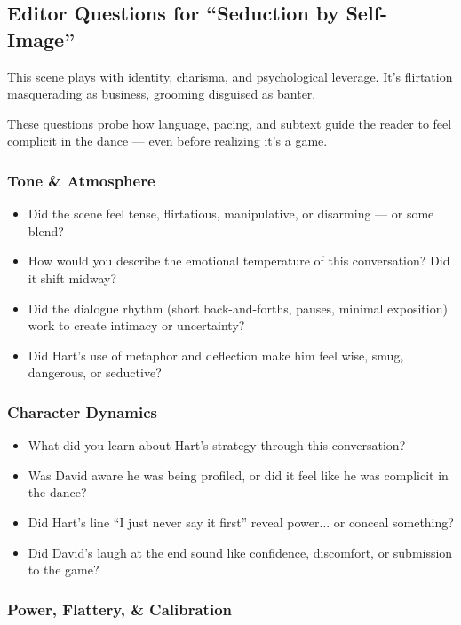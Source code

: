 \subsection*{Editor Questions for ``Seduction by Self-Image''}
This scene plays with identity, charisma, and psychological leverage.
It's flirtation masquerading as business, grooming disguised as banter.

These questions probe how language, pacing, and subtext guide the reader to feel complicit in the dance — even before realizing it’s a game.

\subsubsection{Tone \& Atmosphere}

\begin{itemize}
    \item Did the scene feel tense, flirtatious, manipulative, or disarming — or some blend?
    \item How would you describe the emotional temperature of this conversation? Did it shift midway?
    \item Did the dialogue rhythm (short back-and-forths, pauses, minimal exposition) work to create intimacy or uncertainty?
    \item Did Hart’s use of metaphor and deflection make him feel wise, smug, dangerous, or seductive?
\end{itemize}

\subsubsection{Character Dynamics}

\begin{itemize}
    \item What did you learn about Hart’s strategy through this conversation?
    \item Was David aware he was being profiled, or did it feel like he was complicit in the dance?
    \item Did Hart's line “I just never say it first” reveal power... or conceal something?
    \item Did David’s laugh at the end sound like confidence, discomfort, or submission to the game?
\end{itemize}

\subsubsection{Power, Flattery, \& Calibration}

